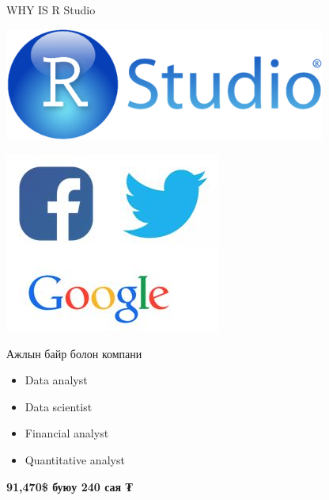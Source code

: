 \documentclass[
  ignorenonframetext,
]{beamer}
\providecommand{\tightlist}{%
  \setlength{\itemsep}{0pt}\setlength{\parskip}{0pt}}
\begin{document}
\begin{frame}{WHY IS R Studio}
\protect\hypertarget{why-is-r-studio}{}

\includegraphics[width=400px]{Picture6}

\includegraphics{Capture.JPG}

Ажлын байр болон компани

\begin{itemize}
\tightlist
\item
  Data analyst
\item
  Data scientist
\item
  Financial analyst
\item
  Quantitative analyst
\end{itemize}

\textbf{91,470\$ буюу 240 сая ₮}

\end{frame}
\end{document}
